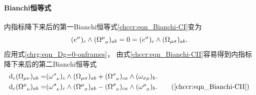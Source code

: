 \paragraph{Bianchi恒等式}
内指标降下来后的第一Bianchi恒等式\eqref{chccr:eqn_Bianchi-CI}变为
\begin{equation}\label{chrg:eqn_Bianchi-CI-bak}
    (e^\sigma)_c \wedge (\Omega_{\hphantom{\sigma} \sigma} ^{\mu})_{ab} = 0 =
    (e^\sigma)_c \wedge (\Omega_{\mu \sigma} )_{ab}  .
\end{equation}
应用式\eqref{chrg:eqn_Dg=0-onframes}，
由式\eqref{chccr:eqn_Bianchi-CII}容易得到内指标降下来后的第二Bianchi恒等式
\begin{align}
    {\rm d}_c (\Omega_{\mu\nu} )_{ab} = &
       ( \omega _{\hphantom{\sigma} \nu}^\sigma )_c \wedge (\Omega_{\mu \sigma} )_{ab}
      +(\Omega_{\hphantom{\sigma} \nu} ^{\sigma})_{ca} \wedge (\omega_{\sigma \mu})_{b}
       . \label{chrg:eqn_Bianchi-CII-down} \\
    {\rm d}_c (\Omega_{\hphantom{\sigma} \nu} ^{\mu})_{ab}  =&
       ( \omega _{\hphantom{\sigma} \nu}^\sigma )_c  \wedge  (\Omega_{\hphantom{\sigma} \sigma} ^{\mu})_{ab}
     - (\Omega_{\hphantom{\sigma} \nu} ^{\sigma})_{ca}\wedge ( \omega _{\hphantom{\sigma} \sigma}^\mu )_b
       . \tag{\ref{chccr:eqn_Bianchi-CII}}
\end{align}


